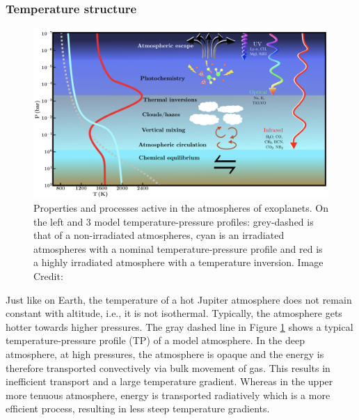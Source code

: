 \subsubsection{Temperature structure}
\label{int:sec:TP}

\begin{figure}
    \centering
    \includegraphics[width = \linewidth]{TPandeffects.png}
    \caption{Properties and processes active in the atmospheres of exoplanets. On the left and 3 model temperature-pressure profiles: grey-dashed is that of a non-irradiated atmospheres, cyan is an irradiated atmospheres with a nominal temperature-pressure profile and red is a highly irradiated atmosphere with a temperature inversion. Image Credit: \citep{Madhusudhan2019}}
    \label{int:fig:TPs}
\end{figure}

Just like on Earth, the temperature of a hot Jupiter atmosphere does not remain constant with altitude, i.e., it is not isothermal. Typically, the atmosphere gets hotter towards higher pressures. The gray dashed line in Figure \ref{int:fig:TPs} shows a typical temperature-pressure profile (TP) of a model atmosphere. In the deep atmosphere, at high pressures, the atmosphere is opaque and the energy is therefore transported convectively via bulk movement of gas. This results in inefficient transport and a large temperature gradient. Whereas in the upper more tenuous atmosphere, energy is transported radiatively which is a more efficient process, resulting in less steep temperature gradients.

